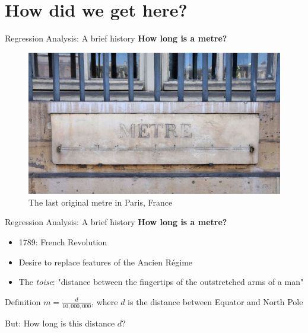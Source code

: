 \documentclass[t]{beamer} 	%
\begin{document}

\section{How did we get here?}

\begin{frame}{Regression Analysis: A brief history}
	\textbf{How long is a metre?}
	\begin{figure}
		\includegraphics[width=\textwidth]{images/metre.jpg}
		\caption*{The last original metre in Paris, France}
	\end{figure}
\end{frame}

\begin{frame}{Regression Analysis: A brief history}
	\textbf{How long is a metre?}
	\begin{itemize}
		\item 1789: French Revolution
		\item Desire to replace features of the Ancien Régime
		\item The \textit{toise}: "distance between the fingertips of the outstretched arms of a man" \citep{toise}
	\end{itemize}
	\pause
	\begin{pabox}{Definition}
		$m = \frac{d}{10,000,000}$,
		where $d$ is the distance between Equator and North Pole
	\end{pabox}
	But: How long is this distance $d$?
\end{frame}
\end{document}
